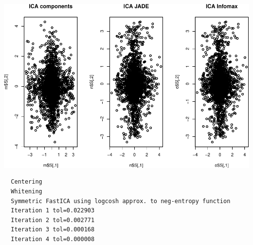 \documentclass[12pt,twoside]{amherstthesis}
\begin{document}
  \begin{center}\includegraphics{ICA_Stats_Comps_files/figure-latex/unnamed-chunk-6-2} \end{center}
  
  \begin{Shaded}
  \begin{Highlighting}[]
  \StringTok{ }\NormalTok{,} \NormalTok{, } \NormalTok{, } \NormalTok{, }
                \NormalTok{, } \NormalTok{, } \NormalTok{, }
                \NormalTok{, } \NormalTok{)}
  \end{Highlighting}
  \end{Shaded}
  
  \begin{verbatim}
  Centering
  Whitening
  Symmetric FastICA using logcosh approx. to neg-entropy function
  Iteration 1 tol=0.022903
  Iteration 2 tol=0.002771
  Iteration 3 tol=0.000168
  Iteration 4 tol=0.000008
  \end{verbatim}
  
\end{document}
